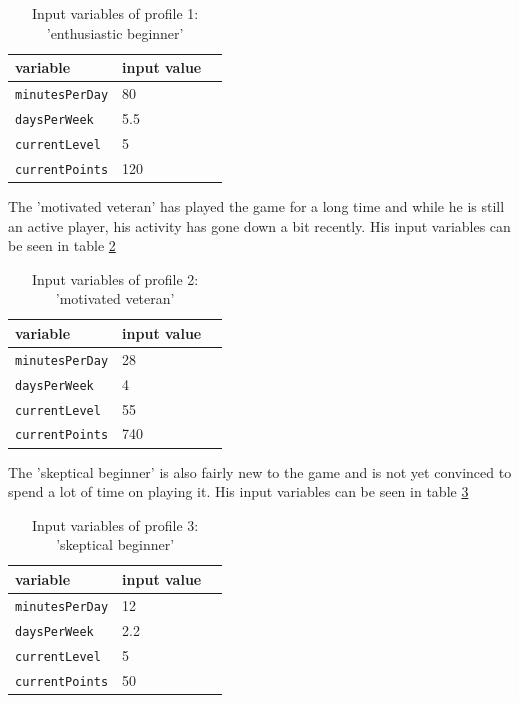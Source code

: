 \begin{table}[H]
\centering
\begin{tabular}{@{}lll@{}}
\toprule
\textbf{variable}  & \textbf{input value} \\ 
\midrule
\texttt{minutesPerDay} & 80 \\
\texttt{daysPerWeek}  & 5.5 \\
\texttt{currentLevel} & 5 \\
\texttt{currentPoints} & 120 \\
\bottomrule
\end{tabular}
\caption{Input variables of profile 1: 'enthusiastic beginner'}
\label{tab:prof1}
\end{table} 

The 'motivated veteran' has played the game for a long time and while he is still an active player, his activity has gone down a bit recently. His input variables can be seen in table \ref{tab:prof2}

\begin{table}[H]
\centering
\begin{tabular}{@{}lll@{}}
\toprule
\textbf{variable}  & \textbf{input value} \\ 
\midrule
\texttt{minutesPerDay} & 28 \\
\texttt{daysPerWeek}  & 4 \\
\texttt{currentLevel} & 55 \\
\texttt{currentPoints} & 740 \\
\bottomrule
\end{tabular}
\caption{Input variables of profile 2: 'motivated veteran'}
\label{tab:prof2}
\end{table}

The 'skeptical beginner' is also fairly new to the game and is not yet convinced to spend a lot of time on playing it. His input variables can be seen in table \ref{tab:prof3}

\begin{table}[H]
\centering
\begin{tabular}{@{}lll@{}}
\toprule
\textbf{variable}  & \textbf{input value} \\ 
\midrule
\texttt{minutesPerDay} & 12 \\
\texttt{daysPerWeek}  & 2.2 \\
\texttt{currentLevel} & 5 \\
\texttt{currentPoints} & 50 \\
\bottomrule
\end{tabular}
\caption{Input variables of profile 3: 'skeptical beginner'}
\label{tab:prof3}
\end{table}

